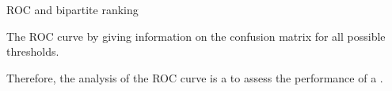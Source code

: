 \begin{frame}{ROC and bipartite ranking}


The ROC curve  by giving information on the confusion matrix for all possible thresholds.

\begin{figure}
    \centering
   
    
\end{figure}

Therefore, the analysis of the ROC curve is a  to assess the performance of a .


\end{frame}

        
